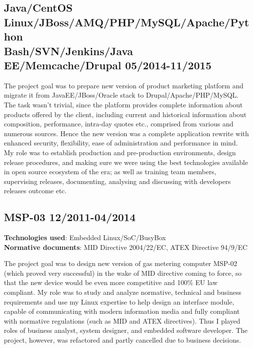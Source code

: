 \documentclass[%
               doublesided,
               paper=a4,
               fontsize=10pt
              ]{my-resume}
\begin{document}
{    \subsection{Java/CentOS Linux/JBoss/AMQ/PHP/MySQL/Apache/Python\\
    Bash/SVN/Jenkins/Java EE/Memcache/Drupal {\small 05/2014-11/2015}}
    The project goal was to prepare new version of product marketing platform
    and migrate it from JavaEE/JBoss/Oracle stack to Drupal/Apache/PHP/MySQL.
    The task wasn't trivial, since the platform provides complete information
    about products offered by the client, including current and historical
    information about composition, performance, intra-day quotes etc., comprised from
    various and numerous sources.  Hence the new version was a complete application rewrite
    with enhanced security, flexibility, ease of administration and performance in mind.
    My role was to establish production and pre-production environments, design release
    procedures, and making sure we were using the best technologies available in open
    source ecosystem of the era; as well as training team members, supervising releases,
    documenting, analysing and discussing with developers releases outcome etc.
    \vspace{0.5em}
    
    \subsection{MSP-03 {\small 12/2011-04/2014}} %
    {\bfseries Technologies used}: Embedded Linux/SoC/BusyBox\\
    {\bfseries Normative documents}: MID Directive 2004/22/EC, ATEX Directive 94/9/EC\par
    The project goal was to design new version of gas metering computer MSP-02
    (which proved very successful) in the wake of MID directive coming to force,
    so that the new device would be even more competitive and 100\% EU law compliant.
    My role was to
    study and analyze normative, technical and business requirements
    and use my Linux expertise to
    help design an interface module, capable of communicating with
    modern information media and fully compliant with normative regulations
    (such as MID and ATEX directives).  Thus I played roles of business analyst, system designer,
    and embedded software developer.
    The project, however, was refactored and partly cancelled due to
    business decisions. %
    
}
\end{document}
